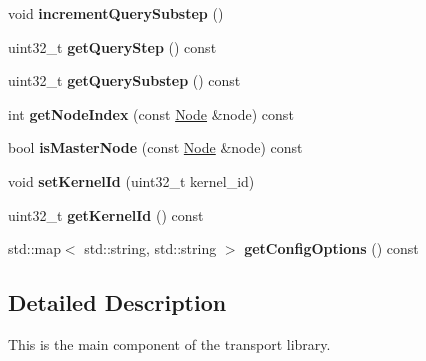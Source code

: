 \begin{DoxyCompactItemize}
\item 
\mbox{\label{classblazingdb_1_1manager_1_1Context_aad6b4624ca3925ed5395159b330f4f9f}} 
void {\bfseries increment\+Query\+Substep} ()
\item 
\mbox{\label{classblazingdb_1_1manager_1_1Context_a99a062320c7d2d3acdaa876635a96f1b}} 
uint32\+\_\+t {\bfseries get\+Query\+Step} () const
\item 
\mbox{\label{classblazingdb_1_1manager_1_1Context_ab8982de5aaebf8f29c0f1d86cf4c84d6}} 
uint32\+\_\+t {\bfseries get\+Query\+Substep} () const
\item 
\mbox{\label{classblazingdb_1_1manager_1_1Context_a087b4b0ced49313fbc9c3b3994aa870e}} 
int {\bfseries get\+Node\+Index} (const \hyperlink{classblazingdb_1_1transport_1_1Node}{Node} \&node) const
\item 
\mbox{\label{classblazingdb_1_1manager_1_1Context_ae7a8106947af5b4500760fb761a86788}} 
bool {\bfseries is\+Master\+Node} (const \hyperlink{classblazingdb_1_1transport_1_1Node}{Node} \&node) const
\item 
\mbox{\label{classblazingdb_1_1manager_1_1Context_a428622bfe697d0d6f4ace3c0c6cef9fd}} 
void {\bfseries set\+Kernel\+Id} (uint32\+\_\+t kernel\+\_\+id)
\item 
\mbox{\label{classblazingdb_1_1manager_1_1Context_a7fa93aeb80ef105da3c812b9da732e5d}} 
uint32\+\_\+t {\bfseries get\+Kernel\+Id} () const
\item 
\mbox{\label{classblazingdb_1_1manager_1_1Context_a7ea6b41e017024e6ab010998ccc40b06}} 
std\+::map$<$ std\+::string, std\+::string $>$ {\bfseries get\+Config\+Options} () const
\end{DoxyCompactItemize}


\subsection{Detailed Description}
This is the main component of the transport library. 

